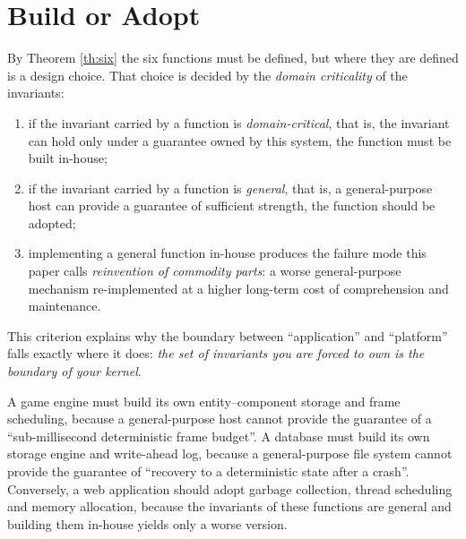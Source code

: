 \section{Build or Adopt}\label{sec:buildadopt}

\begin{corollary}\label{cor:buildadopt}
By Theorem \ref{th:six} the six functions must be defined, but where they are defined is a
design choice. That choice is decided by the \emph{domain criticality} of the invariants:
\begin{enumerate}[label=(\alph*)]
\item if the invariant carried by a function is \emph{domain-critical}, that is, the
      invariant can hold only under a guarantee owned by this system, the function must be
      built in-house;
\item if the invariant carried by a function is \emph{general}, that is, a general-purpose
      host can provide a guarantee of sufficient strength, the function should be adopted;
\item implementing a general function in-house produces the failure mode this paper calls
      \emph{reinvention of commodity parts}: a worse general-purpose mechanism
      re-implemented at a higher long-term cost of comprehension and maintenance.
\end{enumerate}
\end{corollary}

This criterion explains why the boundary between ``application'' and ``platform'' falls
exactly where it does: \emph{the set of invariants you are forced to own is the boundary of
your kernel}.

\begin{example}\label{ex:buildadopt}
A game engine must build its own entity--component storage and frame scheduling, because a
general-purpose host cannot provide the guarantee of a ``sub-millisecond deterministic frame
budget''. A database must build its own storage engine and write-ahead log, because a
general-purpose file system cannot provide the guarantee of ``recovery to a deterministic
state after a crash''. Conversely, a web application should adopt garbage collection, thread
scheduling and memory allocation, because the invariants of these functions are general and
building them in-house yields only a worse version.
\end{example}

